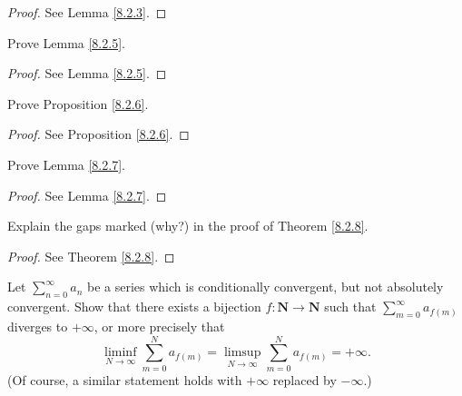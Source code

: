 \begin{proof}
    See Lemma \ref{8.2.3}.
\end{proof}

\begin{exercise}\label{ex 8.2.2}
    Prove Lemma \ref{8.2.5}.
\end{exercise}

\begin{proof}
    See Lemma \ref{8.2.5}.
\end{proof}

\begin{exercise}\label{ex 8.2.3}
    Prove Proposition \ref{8.2.6}.
\end{exercise}

\begin{proof}
    See Proposition \ref{8.2.6}.
\end{proof}

\begin{exercise}\label{ex 8.2.4}
    Prove Lemma \ref{8.2.7}.
\end{exercise}

\begin{proof}
    See Lemma \ref{8.2.7}.
\end{proof}

\begin{exercise}\label{ex 8.2.5}
    Explain the gaps marked (why?) in the proof of Theorem \ref{8.2.8}.
\end{exercise}

\begin{proof}
    See Theorem \ref{8.2.8}.
\end{proof}

\begin{exercise}\label{ex 8.2.6}
    Let \(\sum_{n = 0}^\infty a_n\) be a series which is conditionally convergent, but not absolutely convergent.
    Show that there exists a bijection \(f : \mathbf{N} \to \mathbf{N}\) such that \(\sum_{m = 0}^\infty a_{f(m)}\) diverges to \(+\infty\), or more precisely that
    \[
        \liminf_{N \to \infty} \sum_{m = 0}^N a_{f(m)} = \limsup_{N \to \infty} \sum_{m = 0}^N a_{f(m)} = +\infty.
    \]
    (Of course, a similar statement holds with \(+\infty\) replaced by \(-\infty\).)
\end{exercise}


